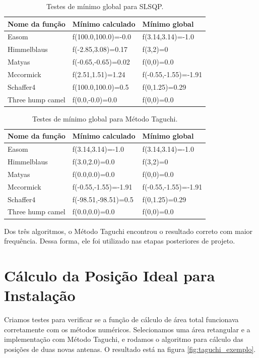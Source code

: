 \documentclass[]{politex}
\begin{document}
\begin{table}[H]
\centering
\begin{tabular}{l|l|l}
 Nome da função & Mínimo calculado & Mínimo global \\ \hline
\rowcolor{Gray}
Easom  &  f(100.0,100.0)=-0.0  &  f(3.14,3.14)=-1.0 \\
\rowcolor{Gray}
Himmelblaus  &  f(-2.85,3.08)=0.17  &  f(3,2)=0 \\
\rowcolor{Gray}
Matyas  &  f(-0.65,-0.65)=0.02  &  f(0,0)=0.0 \\
\rowcolor{Gray}
Mccormick  &  f(2.51,1.51)=1.24  &  f(-0.55,-1.55)=-1.91 \\
\rowcolor{Gray}
Schaffer4  &  f(100.0,100.0)=0.5  &  f(0,1.25)=0.29 \\
Three hump camel  &  f(0.0,-0.0)=0.0  &  f(0,0)=0.0 \\
\end{tabular}
\caption{Testes de mínimo global para SLSQP.}
\label{table:test-slsqp}
\end{table}

\begin{table}[H]
\centering
\begin{tabular}{l|l|l}
Nome da função & Mínimo calculado & Mínimo global \\ \hline
Easom  &  f(3.14,3.14)=-1.0  &  f(3.14,3.14)=-1.0 \\
Himmelblaus  &  f(3.0,2.0)=0.0  &  f(3,2)=0 \\
Matyas  &  f(0.0,0.0)=0.0  &  f(0,0)=0.0 \\
Mccormick  &  f(-0.55,-1.55)=-1.91  &  f(-0.55,-1.55)=-1.91 \\
\rowcolor{Gray}
Schaffer4  &  f(-98.51,-98.51)=0.5  &  f(0,1.25)=0.29 \\
Three hump camel  &  f(0.0,0.0)=0.0  &  f(0,0)=0.0 \\
\end{tabular}
\caption{Testes de mínimo global para Método Taguchi.}
\label{table:test-taguchi}
\end{table}

Dos três algoritmos, o Método Taguchi encontrou o resultado correto com maior
frequência. Dessa forma, ele foi utilizado nas etapas posteriores de projeto.

\section{Cálculo da Posição Ideal para Instalação}

Criamos testes para verificar se a função de cálculo de área total funcionava
corretamente com os métodos numéricos. Selecionamos uma área retangular e a
implementação com Método Taguchi, e rodamos o algoritmo para cálculo das
posições de duas novas antenas. O resultado está na figura
\ref{fig:taguchi_exemplo}.
\end{document}
